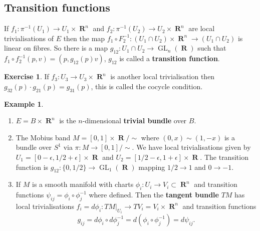 \documentclass[10pt,]{book}
\newcommand{\terminology}[1]{\textbf{#1}}
\theoremstyle{plain}
\theoremstyle{definition}
\newtheorem{example}[theorem]{Example}
\newtheorem{exercise}[theorem]{Exercise}
\numberwithin{equation}{section}
\DeclareMathOperator{\GL}{GL}
\DeclareMathOperator{\RR}{\mathbf{R}}
\begin{document}
\subsection[Transition functions]{Transition functions}\label{subsection-13}
If \(f_1\colon \pi^{-1}(U_1) \to U_1\times \RR^n\) and \(f_2\colon \pi^{-1}(U_2) \to U_2\times \RR^n\) are local trivialisations of \(E\) then the map \(f_1\circ F_2^{-1}\colon (U_1\cap U_2)\times \RR^n \to (U_1 \cap U_2)\) is linear on fibres.
            So there is a map \(g_{12}\colon U_1\cap U_2 \to \GL_n(\RR)\) such that \(f_1\circ f_2^{-1}(p,v) = (p,g_{12}(p) v)\), \(g_{12}\) is called a \terminology{transition function}.%
\begin{exercise}\label{exercise-5}
If \(f_3\colon U_3 \to U_3\times \RR^n \) is another local trivialisation then \(g_{32}(p)\cdot g_{21}(p) = g_{31}(p)\), this is called the cocycle condition.
            \end{exercise}
\begin{example}\label{example-27}
\begin{enumerate}
\item{}\(E = B\times \RR^n\) is the \(n\)-dimensional \terminology{trivial bundle} over \(B\).\item{}The Mobius band \(M = [0,1] \times \RR/\sim\) where \((0,x)\sim (1,-x)\) is a bundle over \(S^1\) via \(\pi\colon M \to [0,1]/\sim\).
                  We have local trivialisations given by \(U_1 = [0-\epsilon, 1/2 + \epsilon]\times \RR\) and \(U_2 = [1/2-\epsilon, 1 + \epsilon]\times \RR\).
                  The transition function is \(g_{12} \colon \{0,1/2\} \to \GL_1(\RR)\) mapping \(1/2\to 1\) and \(0\to -1\).
                \item{}If \(M\) is a smooth manifold with charts \(\phi_i \colon U_i \to V_i \subset \RR^n\) and transition functions \(\psi_{ij} = \phi_i \circ \phi_j ^{-1}\) where defined.
                  Then the \terminology{tangent bundle} \(TM\) has local trivialisations \(f_i = d\phi_i\colon TM|_{U_i}\to TV_i = V_i\times \RR^n\) and transition functions
                  \[g_{ij} = d\phi_i\circ d\phi_j^{-1} = d(\phi_i\circ \phi_j^{-1}) = d\psi_{ij}.\]
                \end{enumerate}
\end{example}
%
\backmatter
%
\end{document}
